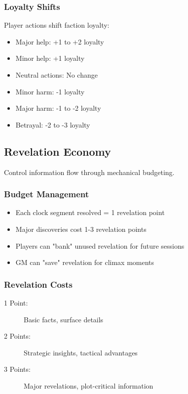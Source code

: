\subsubsection{Loyalty Shifts}

Player actions shift faction loyalty:
\begin{itemize}
\item Major help: +1 to +2 loyalty
\item Minor help: +1 loyalty
\item Neutral actions: No change
\item Minor harm: -1 loyalty
\item Major harm: -1 to -2 loyalty
\item Betrayal: -2 to -3 loyalty
\end{itemize}

\subsection{Revelation Economy}

Control information flow through mechanical budgeting.

\subsubsection{Budget Management}

\begin{itemize}
\item Each clock segment resolved = 1 revelation point
\item Major discoveries cost 1-3 revelation points
\item Players can "bank" unused revelation for future sessions
\item GM can "save" revelation for climax moments
\end{itemize}

\subsubsection{Revelation Costs}

\begin{description}
\item[1 Point:] Basic facts, surface details
\item[2 Points:] Strategic insights, tactical advantages
\item[3 Points:] Major revelations, plot-critical information
\end{description}

